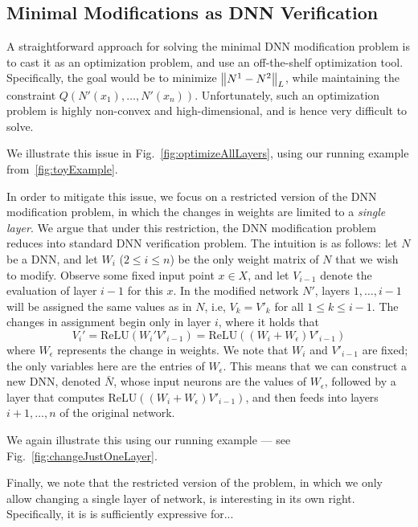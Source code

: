 \documentclass{easychair}
\newcommand{\relu}{\text{ReLU}\xspace{}}
\newcommand{\guy}[1]{\marginpar{\textcolor{orange}{Guy: #1}}}
\begin{document}
\subsection{Minimal Modifications as DNN Verification}

A straightforward approach for solving the minimal DNN modification
problem is to cast it as an optimization problem, and use an
off-the-shelf optimization tool. Specifically, the goal would be to
minimize $\left\lVert N^1-N^2\right\rVert_L$, while maintaining the constraint
$Q(N'(x_1),\ldots, N'(x_n))$. Unfortunately, such an optimization
problem is highly non-convex and high-dimensional, and is hence very
difficult to solve.

We illustrate this issue in Fig.~\ref{fig:optimizeAllLayers}, using
our running example from~\ref{fig:toyExample}.
\guy{TODO: same example from the previous sections}


In order to mitigate this issue, we focus on a restricted version of
the DNN modification problem, in which the changes in weights are
limited to a \emph{single layer}. We argue that under this
restriction, the DNN modification problem reduces into standard DNN
verification problem. The intuition is as follows: let $N$ be a DNN,
and let $W_i$ ($2\leq i\leq n$) be the only weight matrix of $N$ that
we wish to modify. Observe some fixed input point $x\in X$, and let
$V_{i-1}$ denote the evaluation of layer $i-1$ for this $x$. In the
modified network $N'$, layers $1,\ldots,i-1$ will be assigned the same
values as in $N$, i.e, $V_k=V'_k$ for all $1\leq k\leq i-1$. The
changes in assignment begin only in layer $i$, where it holds that
\[
  V_i' = \relu{}(W_i'V'_{i-1}) = \relu{}((W_i+W_\epsilon)V'_{i-1})
\]
where $W_\epsilon$ represents the change in weights. We note that
$W_i$ and $V'_{i-1}$ are fixed; the only variables here are the
entries of $W_\epsilon$. This means that we can construct a new DNN,
denoted $\bar{N}$, whose input neurons are the values of $W_\epsilon$,
followed by a layer that computes $\relu{}((W_i+W_\epsilon)V'_{i-1})$,
and then feeds into layers $i+1,\ldots,n$ of the original network.

We again illustrate this using our running example --- see
Fig.~\ref{fig:changeJustOneLayer}.


Finally, we note that the restricted version of the problem, in which
we only allow changing a single layer of network, is interesting in
its own right. Specifically, it is is sufficiently expressive for...
\guy{TODO: justify why this is interesting}
\end{document}
